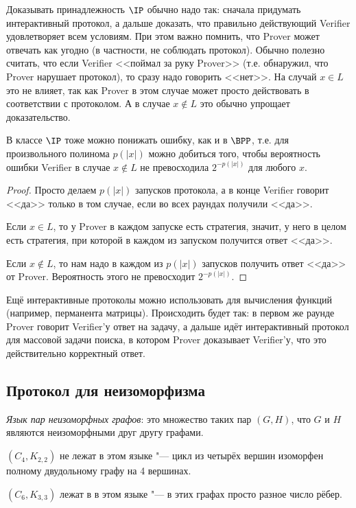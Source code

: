 	\begin{Rem}
		Доказывать принадлежность $\IP$ обычно надо так: сначала придумать интерактивный протокол, а дальше доказать, что правильно действующий Verifier удовлетворяет всем условиям.
		При этом важно помнить, что Prover может отвечать как угодно (в частности, не соблюдать протокол).
		Обычно полезно считать, что если Verifier <<поймал за руку Prover>> (т.е. обнаружил, что Prover нарушает протокол), то сразу надо говорить <<нет>>.
		На случай $x \in L$ это не влияет, так как Prover в этом случае может просто действовать в соответствии с протоколом.
		А в случае $x \notin L$ это обычно упрощает доказательство.
	\end{Rem}
	\begin{assertion}
		В классе $\IP$ тоже можно понижать ошибку, как и в $\BPP$, т.е. для произвольного полинома $p(|x|)$ можно добиться того, чтобы
		вероятность ошибки Verifier в случае $x \notin L$ не превосходила $2^{-p(|x|)}$ для любого $x$.
	\end{assertion}
	\begin{proof}
		Просто делаем $p(|x|)$ запусков протокола, а в конце Verifier говорит <<да>> только в том случае, если во всех раундах получили <<да>>.

		Если $x \in L$, то у Prover в каждом запуске есть стратегия, значит, у него в целом есть стратегия, при которой в каждом из запуском получится ответ <<да>>.

		Если $x \notin L$, то нам надо в каждом из $p(|x|)$ запусков получить ответ <<да>> от Prover.
		Вероятность этого не превосходит $2^{-p(|x|)}$.
	\end{proof}
	\begin{Rem}
		Ещё интерактивные протоколы можно использовать для вычисления функций (например, перманента матрицы).
		Происходить будет так: в первом же раунде Prover говорит Verifier'у ответ на задачу, а дальше идёт интерактивный протокол
		для массовой задачи поиска, в котором Prover доказывает Verifier'у, что это действительно корректный ответ.
	\end{Rem}

\subsection{Протокол для неизоморфизма}
	\begin{Def}
		\textit{Язык пар неизоморфных графов}: это множество таких пар $(G, H)$, что $G$ и $H$ являются неизоморфными друг другу графами.
	\end{Def}
	\begin{exmp}
		$(C_4, K_{2,2})$ не лежат в этом языке "--- цикл из четырёх вершин изоморфен полному двудольному графу на 4 вершинах.
	\end{exmp}
	\begin{exmp}
		$(C_6, K_{3,3})$ лежат в в этом языке "--- в этих графах просто разное число рёбер.
	\end{exmp}

